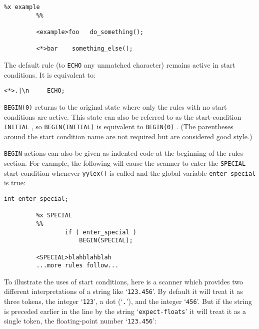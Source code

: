 \documentclass[openany,oneside]{book}
\begin{document}
\begin{verbatim}
%x example
         %%
     
         <example>foo   do_something();
     
         <*>bar    something_else();
\end{verbatim}


The default rule (to \verb`ECHO` any unmatched character) remains active
in start conditions.  It is equivalent to:


\begin{verbatim}
<*>.|\n     ECHO;
\end{verbatim}


 \verb`BEGIN(0)` returns to the original state where only the rules with
no start conditions are active.  This state can also be referred to as
the start-condition \verb`INITIAL` , so \verb`BEGIN(INITIAL)` is
equivalent to \verb`BEGIN(0)` .  (The parentheses around the start
condition name are not required but are considered good style.)

 \verb`BEGIN` actions can also be given as indented code at the beginning
of the rules section.  For example, the following will cause the scanner
to enter the \verb`SPECIAL` start condition whenever \verb`yylex()` is
called and the global variable \verb`enter_special` is true:


\begin{verbatim}
int enter_special;
     
         %x SPECIAL
         %%
                 if ( enter_special )
                     BEGIN(SPECIAL);
     
         <SPECIAL>blahblahblah
         ...more rules follow...
\end{verbatim}


To illustrate the uses of start conditions, here is a scanner which
provides two different interpretations of a string like ‘\verb`123.456`’. 
By default it will treat it as three tokens, the integer ‘\verb`123`’, a
dot (‘\verb`.`’), and the integer ‘\verb`456`’.  But if the string is
preceded earlier in the line by the string ‘\verb`expect-floats`’ it will
treat it as a single token, the floating-point number ‘\verb`123.456`’:
\end{document}
